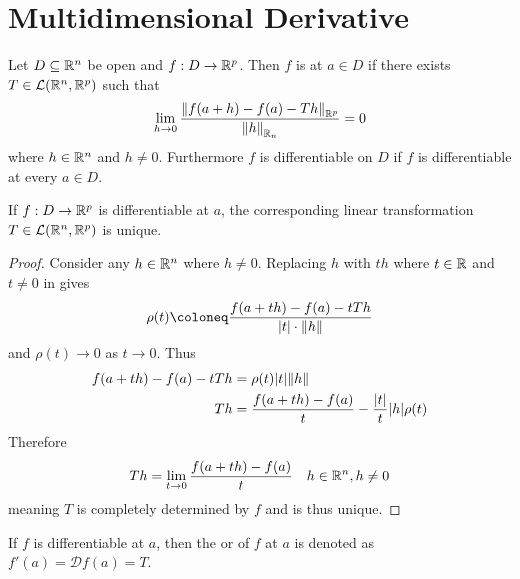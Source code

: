 \documentclass[../main.tex]{subfiles}
\begin{document}
\section[Derivatives I]{Multidimensional Derivative}

\begin{definition}[Differentiability]
    \label{def:differentiability}
    Let $D \subseteq \mathbb{R}^n$ be open and $f : D \to \mathbb{R}^p$. Then $f$ is  at $a \in D$ if there exists $T \in \mathcal{L}(\mathbb{R}^n, \mathbb{R}^p)$ such that
    \[
        \lim_{h \to 0} \frac{\norm{f(a + h) - f(a) - Th}_{\mathbb{R}^p}}{\norm{h}_{\mathbb{R}_n}} = 0
    \]
    where $h \in \mathbb{R}^n$ and $h \neq 0$. Furthermore $f$ is differentiable on $D$ if $f$ is differentiable at every $a \in D$.
\end{definition}

\begin{theorem}
    \label{thm:uniquederivative}
    If $f : D \to \mathbb{R}^p$ is differentiable at $a$, the corresponding linear transformation $T \in \mathcal{L}(\mathbb{R}^n, \mathbb{R}^p)$ is unique.
\end{theorem}

\begin{proof}
    Consider any $h \in \mathbb{R}^n$ where $h \neq 0$. Replacing $h$ with $th$ where $t \in \mathbb{R}$ and $t \neq 0$ in  gives
    \[
        \rho(t) \coloneq \frac{f(a+th) - f(a) - tTh}{\qty|t| \cdot \norm{h}}
    \]
    and $\rho(t) \to 0$ as $t \to 0$. Thus
    \begin{align*}
        f(a+th) - f(a) - tTh &= \rho(t) \qty|t| \norm{h}  \\
        Th &= \frac{f(a+th) - f(a)}{t} - \frac{|t|}{t} |h| \rho(t)
    \end{align*}
    Therefore
    \[
        Th = \lim_{t \to 0} \frac{f(a+th) - f(a)}{t} \quad h \in \mathbb{R}^n, h \neq 0
    \]
    meaning $T$ is completely determined by $f$ and is thus unique.
\end{proof}

\begin{definition}[Differential]
    If $f$ is differentiable at $a$, then the  or  of $f$ at $a$ is denoted as $f'(a) = \mathcal{D} f(a) = T$.
\end{definition}
\end{document}
